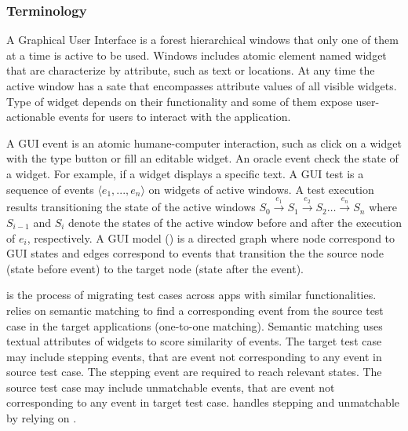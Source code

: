 \subsubsection{Terminology}


A Graphical User Interface is a  forest hierarchical windows that only one of them at a time is active to be used.  
Windows includes atomic element named widget that are characterize by attribute, such as text or locations.
At any time the active window has a sate that encompasses attribute values of all visible widgets.
Type of widget depends on their functionality and some of them expose user-actionable events for users to interact with the application.

A GUI event is an atomic humane-computer interaction, such as click on a widget with the type button or fill an editable widget.
An oracle event check the state of a widget. 
For example, if a widget displays a specific text. 
A GUI test is a sequence of events $\langle e_1,..., e_n\rangle$ on widgets of active windows.
A test execution results transitioning the state of the active windows $S_{0} \xrightarrow{e_1} S_1 \xrightarrow{e_2} S_2 \ldots \xrightarrow{e_n} S_{n}$ 
where $S_{i-1}$ and $S_i$ denote the states of the active window before and after the execution of $e_i$, respectively. 
A GUI model (\tam) is a directed graph where node correspond to GUI states  and edges correspond to events that transition the the source node (state before event) to the target node (state after the event).

\testreuse is the process of migrating test cases across apps with similar functionalities. 
\testreuse relies on semantic matching to find a corresponding event from the source test case in the target applications (one-to-one matching). 
Semantic matching uses textual attributes of widgets to score similarity of events.
The target test case may include stepping events, that are event not corresponding to any event in source test case.
The stepping event are required to reach relevant states.
The source test case may include  unmatchable events, that are event not corresponding to any event in target test case.
\testreuse handles stepping and unmatchable by relying on \tam.


